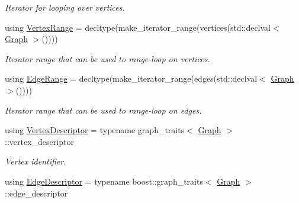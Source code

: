 \begin{DoxyCompactItemize}
\begin{DoxyCompactList}\small\item\em Iterator for looping over vertices. \end{DoxyCompactList}\item 
using \hyperlink{structslb_1_1core_1_1ui_1_1StateGraph_a586a27745242d8925a67f2f5ec6335f7}{Vertex\+Range} = decltype(make\+\_\+iterator\+\_\+range(vertices(std\+::declval$<$ \hyperlink{structslb_1_1core_1_1ui_1_1StateGraph_af2cacea8f7165ee45140ff842a243c90}{Graph} $>$())))\hypertarget{structslb_1_1core_1_1ui_1_1StateGraph_a586a27745242d8925a67f2f5ec6335f7}{}\label{structslb_1_1core_1_1ui_1_1StateGraph_a586a27745242d8925a67f2f5ec6335f7}

\begin{DoxyCompactList}\small\item\em Iterator range that can be used to range-\/loop on vertices. \end{DoxyCompactList}\item 
using \hyperlink{structslb_1_1core_1_1ui_1_1StateGraph_a43d35f2a042bffa0d84013cee6af8dd1}{Edge\+Range} = decltype(make\+\_\+iterator\+\_\+range(edges(std\+::declval$<$ \hyperlink{structslb_1_1core_1_1ui_1_1StateGraph_af2cacea8f7165ee45140ff842a243c90}{Graph} $>$())))\hypertarget{structslb_1_1core_1_1ui_1_1StateGraph_a43d35f2a042bffa0d84013cee6af8dd1}{}\label{structslb_1_1core_1_1ui_1_1StateGraph_a43d35f2a042bffa0d84013cee6af8dd1}

\begin{DoxyCompactList}\small\item\em Iterator range that can be used to range-\/loop on edges. \end{DoxyCompactList}\item 
using \hyperlink{structslb_1_1core_1_1ui_1_1StateGraph_ab2d88fce7d30dc6346910900212a7e6d}{Vertex\+Descriptor} = typename graph\+\_\+traits$<$ \hyperlink{structslb_1_1core_1_1ui_1_1StateGraph_af2cacea8f7165ee45140ff842a243c90}{Graph} $>$\+::vertex\+\_\+descriptor\hypertarget{structslb_1_1core_1_1ui_1_1StateGraph_ab2d88fce7d30dc6346910900212a7e6d}{}\label{structslb_1_1core_1_1ui_1_1StateGraph_ab2d88fce7d30dc6346910900212a7e6d}

\begin{DoxyCompactList}\small\item\em Vertex identifier. \end{DoxyCompactList}\item 
using \hyperlink{structslb_1_1core_1_1ui_1_1StateGraph_a7e894f002383b1687652a91549c3656d}{Edge\+Descriptor} = typename boost\+::graph\+\_\+traits$<$ \hyperlink{structslb_1_1core_1_1ui_1_1StateGraph_af2cacea8f7165ee45140ff842a243c90}{Graph} $>$\+::edge\+\_\+descriptor\hypertarget{structslb_1_1core_1_1ui_1_1StateGraph_a7e894f002383b1687652a91549c3656d}{}\label{structslb_1_1core_1_1ui_1_1StateGraph_a7e894f002383b1687652a91549c3656d}


\end{DoxyCompactItemize}
